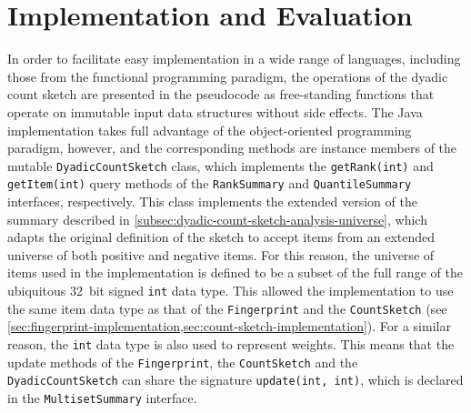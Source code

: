 \section{Implementation and Evaluation}
\label{sec:dyadic-count-sketch-implementation}

In order to facilitate easy implementation in a wide range of languages, including those from the functional programming paradigm, the operations of the dyadic count sketch are presented in the pseudocode as free-standing functions that operate on immutable input data structures without side effects.
The Java implementation takes full advantage of the object-oriented programming paradigm, however, and the corresponding methods are instance members of the mutable \lstinline{DyadicCountSketch} class, which implements the \lstinline{getRank(int)} and \lstinline{getItem(int)} query methods of the \lstinline{RankSummary} and \lstinline{QuantileSummary} interfaces, respectively.
This class implements the extended version of the summary described in \cref{subsec:dyadic-count-sketch-analysis-universe}, which adapts the original definition of the sketch to accept items from an extended universe of both positive and negative items.
For this reason, the universe of items used in the implementation is defined to be a subset of the full range of the ubiquitous \num{32}~bit signed \lstinline{int} data type.
This allowed the implementation to use the same item data type as that of the \lstinline{Fingerprint} and the \lstinline{CountSketch} (see \cref{sec:fingerprint-implementation,sec:count-sketch-implementation}).
For a similar reason, the \lstinline{int} data type is also used to represent weights.
This means that the update methods of the \lstinline{Fingerprint}, the \lstinline{CountSketch} and the \lstinline{DyadicCountSketch} can share the signature \lstinline{update(int, int)}, which is declared in the \lstinline{MultisetSummary} interface.


